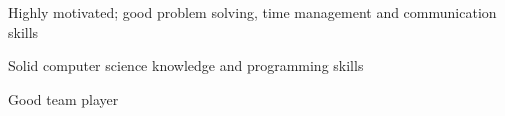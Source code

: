  \vspace{1em}
 \begin{cvitems}
 	\item
 	{Highly motivated; good problem solving, time management and communication skills}
 	
 	\item
 	{Solid computer science knowledge and programming skills}
 	
 	\item
 	{Good team player}
 	
 	
 \end{cvitems}
 \vspace{1em}